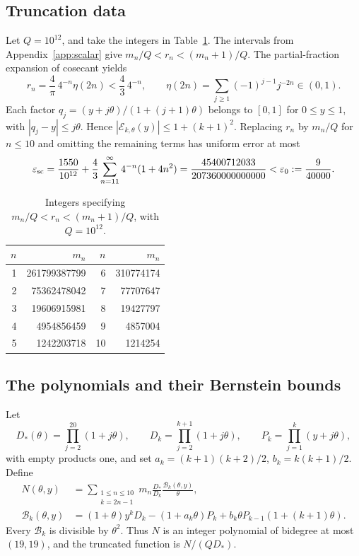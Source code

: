 \documentclass[11pt]{amsart}
\theoremstyle{remark}
\theoremstyle{plain}
\numberwithin{equation}{section}
\newcommand{\epssc}{\varepsilon_{\rm sc}}
\begin{document}
\subsection{Truncation data}

Let \(Q=10^{12}\), and take the integers in
Table~\ref{tab:cosecant}.
The intervals from Appendix~\ref{app:scalar} give
\(m_n/Q<r_n<(m_n+1)/Q\).
The partial-fraction expansion of cosecant yields
\[
 r_n=\frac4\pi\,4^{-n}\eta(2n)<\frac43\,4^{-n},
 \qquad
 \eta(2n)=\sum_{j\ge1}(-1)^{j-1}j^{-2n}\in(0,1).
\]
Each factor
\(q_j=(y+j\theta)/(1+(j+1)\theta)\) belongs to \([0,1]\) for
\(0\le y\le1\), with \(|q_j-y|\le j\theta\).
Hence \(|\mathcal E_{k,\theta}(y)|\le1+(k+1)^2\).
Replacing \(r_n\) by \(m_n/Q\) for \(n\le10\) and omitting the
remaining terms has uniform error at most
\begin{equation}\label{eq:uniformtail}
 \epssc=
 \frac{1550}{10^{12}}
 +\frac43\sum_{n=11}^{\infty}4^{-n}(1+4n^2)
 =\frac{45400712033}{207360000000000}
 <\varepsilon_0:=\frac9{40000}.
\end{equation}

\begin{table}[ht]
\centering
\caption{Integers specifying \(m_n/Q<r_n<(m_n+1)/Q\), with
\(Q=10^{12}\).}
\label{tab:cosecant}
\begin{tabular}{@{}rrrr@{}}
\toprule
\(n\) & \(m_n\) & \(n\) & \(m_n\)\\
\midrule
1 & 261799387799 & 6 & 310774174\\
2 & 75362478042  & 7 & 77707647\\
3 & 19606915981  & 8 & 19427797\\
4 & 4954856459   & 9 & 4857004\\
5 & 1242203718   & 10 & 1214254\\
\bottomrule
\end{tabular}
\end{table}

\subsection{The polynomials and their Bernstein bounds}

Let
\[
 D_*(\theta)=\prod_{j=2}^{20}(1+j\theta),\qquad
 D_k=\prod_{j=2}^{k+1}(1+j\theta),\qquad
 P_k=\prod_{j=1}^k(y+j\theta),
\]
with empty products one, and set
\(a_k=(k+1)(k+2)/2\), \(b_k=k(k+1)/2\).
Define
\begin{equation*}
 \begin{split}
 N(\theta,y)
 &=\sum_{\substack{1\le n\le10\\k=2n-1}}
 m_n\frac{D_*}{D_k}\frac{\mathcal B_k(\theta,y)}{\theta},\\
 \mathcal B_k(\theta,y)
 &=(1+\theta)y^kD_k-(1+a_k\theta)P_k
   +b_k\theta P_{k-1}(1+(k+1)\theta).
 \end{split}
\end{equation*}
Every \(\mathcal B_k\) is divisible by \(\theta^2\).
Thus \(N\) is an integer polynomial of bidegree at most \((19,19)\),
and the truncated function is \(N/(QD_*)\).
\end{document}
